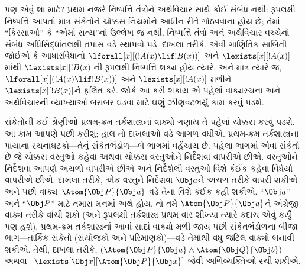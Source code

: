 પણ એવું શા માટે? પ્રથમ નજરે નિષ્પત્તિ તંત્રોને અર્થવિચાર સાથે
કોઈ સંબંધ નથી: રૂપલક્ષી નિષ્પત્તિ આપતાં માત્ર સંકેતોને ચોક્કસ
નિયમોને આધીન રીતે ગોઠવવાના હોય છે; તેમાં ``કિસ્સાઓ'' કે ``એમાં
સત્ય''નો ઉલ્લેખ જ નથી. નિષ્પત્તિ તંત્રો અને અર્થવિચાર વચ્ચેનો
સંબંધ અધિસિદ્ધાંતલક્ષી તપાસ વડે સ્થાપવો પડે. દાખલા તરીકે, એવી
ગાણિતિક સાબિતી જોઈએ કે આધારવિધાનો
$\lforall[x][(!A(x) \lif !B(x))]$ અને $\lexists[x][!A(x)]$માંથી
$\lexists[x][!B(x)]$ની રૂપલક્ષી નિષ્પત્તિ શક્ય હોય ત્યારે, અને
માત્ર ત્યારે જ, $\lforall[x][(!A(x) \lif !B(x))]$ અને
$\lexists[x][!A(x)]$ મળીને $\lexists[x][!B(x)]$ને ફલિત કરે. જોકે આ
કરી શકાય એ પહેલાં વાક્યરચના અને અર્થવિચારની વ્યાખ્યાઓ બરાબર ઘડવા માટે
ઘણું ઝીણવટભર્યું કામ કરવું પડશે.
\endgroup


\begingroup
\makeatletter{}\makeatother


\label{guunit:OLP-0141}


સંકેતોની કઈ શ્રેણીઓ પ્રથમ-ક્રમ તર્કશાસ્ત્રનાં વાક્યો ગણાય તે
પહેલાં ચોક્કસ કરવું પડશે. આ કામ આપણે પછી કરીશું; હાલ તો દાખલાઓ વડે
આગળ વધીએ. પ્રથમ-ક્રમ તર્કશાસ્ત્રના પાયાના રચનાઘટકો---તેનું
સંકેતભંડોળ---બે ભાગમાં વહેંચાય છે. પહેલા ભાગમાં એવા સંકેતો છે જે
ચોક્કસ વસ્તુઓ કહેવા અથવા ચોક્કસ વસ્તુઓને નિર્દેશવા વાપરીએ છીએ.
વસ્તુઓને નિર્દેશવા આપણે અચળો વાપરીએ છીએ અને નિર્દેશેલી
વસ્તુઓ વિશે કંઈક કહેવા વિધેયો વાપરીએ છીએ. દાખલા તરીકે, એક
વસ્તુને નિર્દેશવા $\Obj a$ને અચળ તરીકે વાપરી શકીએ અને પછી
વાક્ય~$\Atom{\Obj P}{\Obj a}$ વડે તેના વિશે કંઈક કહી શકીએ.
``$\Obj a$'' અને ``$\Obj P$'' માટે તમારા મનમાં અર્થ હોય, તો તમે
$\Atom{\Obj P}{\Obj a}$ને અંગ્રેજી વાક્ય તરીકે વાંચી શકો (અને
રૂપલક્ષી તર્કશાસ્ત્ર પ્રથમ વાર શીખ્યા ત્યારે કદાચ એવું કર્યું પણ હશે).
પ્રથમ-ક્રમ તર્કશાસ્ત્રનાં આવાં સાદાં વાક્યો મળી જાય પછી
સંકેતભંડોળના બીજા ભાગ---તાર્કિક સંકેતો (સંયોજકો અને પરિમાણકો)---વડે
તેમાંથી વધુ જટિલ વાક્યો બનાવી શકીએ. તેથી, દાખલા તરીકે,
$(\Atom{\Obj P}{\Obj a} \land \Atom{\Obj Q}{\Obj b})$ અથવા
~$\lexists[\Obj x][\Atom{\Obj P}{\Obj x}]$ જેવી અભિવ્યક્તિઓ રચી શકીએ.

